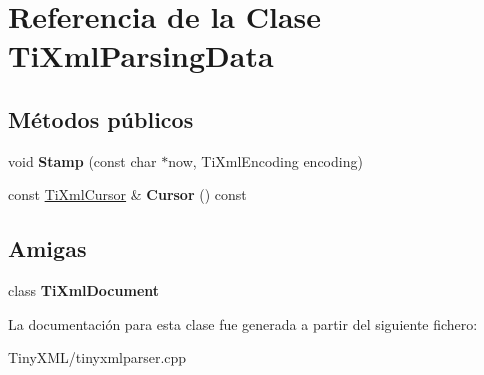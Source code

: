 \hypertarget{class_ti_xml_parsing_data}{\section{Referencia de la Clase Ti\-Xml\-Parsing\-Data}
\label{class_ti_xml_parsing_data}
}
\subsection*{Métodos públicos}
\begin{DoxyCompactItemize}
\item 
\hypertarget{class_ti_xml_parsing_data_a65cee8ab77a36c605db08c84b4c30a7d}{void {\bfseries Stamp} (const char $\ast$now, Ti\-Xml\-Encoding encoding)}\label{class_ti_xml_parsing_data_a65cee8ab77a36c605db08c84b4c30a7d}

\item 
\hypertarget{class_ti_xml_parsing_data_a9e63d965fdb53ff4ac711e105269e918}{const \hyperlink{struct_ti_xml_cursor}{Ti\-Xml\-Cursor} \& {\bfseries Cursor} () const }\label{class_ti_xml_parsing_data_a9e63d965fdb53ff4ac711e105269e918}

\end{DoxyCompactItemize}
\subsection*{Amigas}
\begin{DoxyCompactItemize}
\item 
\hypertarget{class_ti_xml_parsing_data_a173617f6dfe902cf484ce5552b950475}{class {\bfseries Ti\-Xml\-Document}}\label{class_ti_xml_parsing_data_a173617f6dfe902cf484ce5552b950475}

\end{DoxyCompactItemize}


La documentación para esta clase fue generada a partir del siguiente fichero\-:\begin{DoxyCompactItemize}
\item 
Tiny\-X\-M\-L/tinyxmlparser.\-cpp\end{DoxyCompactItemize}
